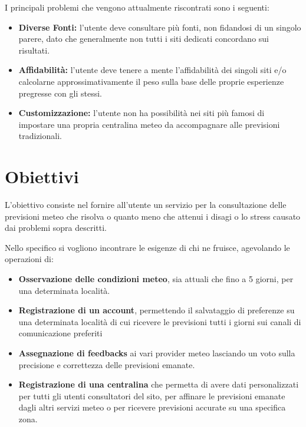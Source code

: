 I principali problemi che vengono attualmente riscontrati sono i seguenti:
\begin{itemize}
    \item \textbf{Diverse Fonti:} l'utente deve consultare più fonti, non fidandosi di un singolo parere, dato che generalmente non tutti i siti dedicati concordano sui risultati.
    \item \textbf{Affidabilità:} l'utente deve tenere a mente l'affidabilità dei singoli siti e/o calcolarne approssimativamente il peso sulla base delle proprie esperienze pregresse con gli stessi.
    \item \textbf{Customizzazione:} l'utente non ha possibilità nei siti più famosi di impostare una propria centralina meteo da accompagnare alle previsioni tradizionali.
\end{itemize}
 
\section{Obiettivi}
L'obiettivo consiste nel fornire all'utente un servizio per la consultazione delle previsioni meteo che risolva o quanto meno che attenui i disagi o lo stress causato dai problemi sopra descritti. 

Nello specifico si vogliono incontrare le esigenze di chi ne fruisce, agevolando le operazioni di:
\begin{itemize}
    \item \textbf{Osservazione delle condizioni meteo}, sia attuali che fino a 5 giorni, per una determinata località.
    \item \textbf{Registrazione di un account}, permettendo il salvataggio di preferenze su una determinata località di cui ricevere le previsioni tutti i giorni sui canali di comunicazione preferiti
    \item \textbf{Assegnazione di feedbacks} ai vari provider meteo lasciando un voto sulla precisione e correttezza delle previsioni emanate. 
    \item \textbf{Registrazione di una centralina} che permetta di avere dati personalizzati per tutti gli utenti consultatori del sito, per affinare le previsioni emanate dagli altri servizi meteo o per ricevere previsioni accurate su una specifica zona.
\end{itemize}






